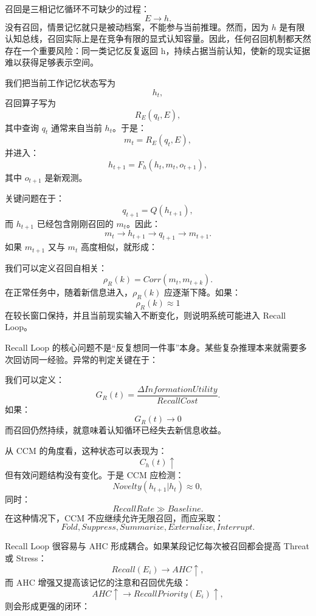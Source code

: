 召回是三相记忆循环不可缺少的过程：
\[
E\rightarrow h.
\]
没有召回，情景记忆就只是被动档案，不能参与当前推理。然而，因为 $h$ 是有限认知总线，召回实际上是在竞争有限的显式认知容量。因此，任何召回机制都天然存在一个重要风险：同一类记忆反复返回 h，持续占据当前认知，使新的现实证据难以获得足够表示空间。

我们把当前工作记忆状态写为
\[
h_t,
\]
召回算子写为
\[
R_E(q_t,E),
\]
其中查询 $q_t$ 通常来自当前 $h_t$。于是：
\[
m_t
=
R_E(q_t,E),
\]
并进入：
\[
h_{t+1}
=
F_h(h_t,m_t,o_{t+1}),
\]
其中 $o_{t+1}$ 是新观测。

关键问题在于：
\[
q_{t+1}
=
Q(h_{t+1}),
\]
而 $h_{t+1}$ 已经包含刚刚召回的 $m_t$。因此：
\[
m_t
\rightarrow
h_{t+1}
\rightarrow
q_{t+1}
\rightarrow
m_{t+1}.
\]
如果 $m_{t+1}$ 又与 $m_t$ 高度相似，就形成：
\begin{statementbox}
\centering
{}
\end{statementbox}

我们可以定义召回自相关：
\[
\rho_R(k)
=
Corr(m_t,m_{t+k}).
\]
在正常任务中，随着新信息进入，$\rho_R(k)$ 应逐渐下降。如果：
\[
\rho_R(k)\approx 1
\]
在较长窗口保持，并且当前现实输入不断变化，则说明系统可能进入 Recall Loop。

Recall Loop 的核心问题不是“反复想同一件事”本身。某些复杂推理本来就需要多次回访同一经验。异常的判定关键在于：
\begin{statementbox}
\centering
{}
\end{statementbox}
我们可以定义：
\[
G_R(t)
=
\frac{
\Delta InformationUtility
}{
RecallCost
}.
\]
如果：
\[
G_R(t)\rightarrow 0
\]
而召回仍然持续，就意味着认知循环已经失去新信息收益。

从 CCM 的角度看，这种状态可以表现为：
\[
C_h(t)\uparrow
\]
但有效问题结构没有变化。于是 CCM 应检测：
\[
Novelty(h_{t+1}|h_t)\approx 0,
\]
同时：
\[
RecallRate\gg Baseline.
\]
在这种情况下，CCM 不应继续允许无限召回，而应采取：
\[
Fold,
Suppress,
Summarize,
Externalize,
Interrupt.
\]

Recall Loop 很容易与 AHC 形成耦合。如果某段记忆每次被召回都会提高 Threat 或 Stress：
\[
Recall(E_i)\rightarrow AHC\uparrow,
\]
而 AHC 增强又提高该记忆的注意和召回优先级：
\[
AHC\uparrow\rightarrow RecallPriority(E_i)\uparrow,
\]
则会形成更强的闭环：
\begin{statementbox}
\centering
{}
\end{statementbox}

